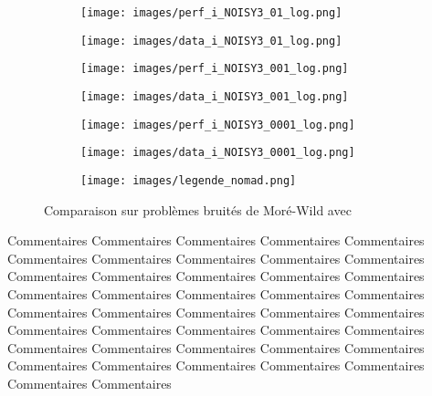 	\begin{figure}[!htb] %
		\centering
		\begin{subfigure}{0.43\textwidth}
			\texttt{[image: images/perf\_i\_NOISY3\_01\_log.png]}
		\end{subfigure}%
		\begin{subfigure}{0.43\textwidth}
			\texttt{[image: images/data\_i\_NOISY3\_01\_log.png]}
		\end{subfigure}
		\smallskip
		\begin{subfigure}{0.43\textwidth}
			\texttt{[image: images/perf\_i\_NOISY3\_001\_log.png]}
		\end{subfigure}%
		\begin{subfigure}{0.43\textwidth}
			\texttt{[image: images/data\_i\_NOISY3\_001\_log.png]}
		\end{subfigure}
		\smallskip
		\begin{subfigure}{0.43\textwidth}
			\texttt{[image: images/perf\_i\_NOISY3\_0001\_log.png]}
		\end{subfigure}%
		\begin{subfigure}{0.43\textwidth}
			\texttt{[image: images/data\_i\_NOISY3\_0001\_log.png]}
		\end{subfigure}
		\smallskip
		\begin{subfigure}{0.95\textwidth}
			\texttt{[image: images/legende\_nomad.png]}
		\end{subfigure}
		\caption{Comparaison sur problèmes bruités de Moré-Wild avec \CS} \label{fig:3}
	\end{figure}
	\clearpage
	Commentaires Commentaires Commentaires Commentaires Commentaires Commentaires Commentaires Commentaires Commentaires Commentaires Commentaires Commentaires Commentaires Commentaires Commentaires Commentaires Commentaires Commentaires Commentaires Commentaires Commentaires Commentaires Commentaires Commentaires Commentaires Commentaires Commentaires Commentaires Commentaires Commentaires Commentaires Commentaires Commentaires Commentaires Commentaires Commentaires Commentaires Commentaires Commentaires Commentaires Commentaires Commentaires 
	\clearpage
